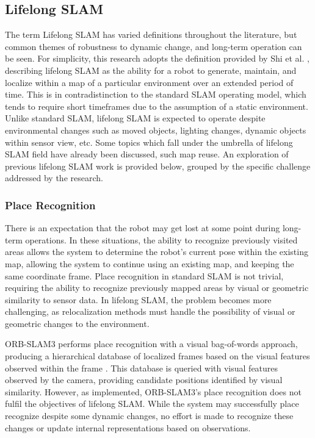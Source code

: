 \subsection{Lifelong SLAM}

The term Lifelong SLAM has varied definitions throughout the literature, but common themes of robustness to dynamic change, and long-term operation can be seen. For simplicity, this research adopts the definition provided by Shi et al. \cite{shiAreWeReady2020}, describing lifelong SLAM as the ability for a robot to generate, maintain, and localize within a map of a particular environment over an extended period of time. This is in contradistinction to the standard SLAM operating model, which tends to require short timeframes due to the assumption of a static environment. Unlike standard SLAM, lifelong SLAM is expected to operate despite environmental changes such as moved objects, lighting changes, dynamic objects within sensor view, etc. Some topics which fall under the umbrella of lifelong SLAM field have already been discussed, such map reuse. An exploration of previous lifelong SLAM work is provided below, grouped by the specific challenge addressed by the research.

\subsubsection{Place Recognition}

There is an expectation that the robot may get lost at some point during long-term operations. In these situations, the ability to recognize previously visited areas allows the system to determine the robot's current pose within the existing map, allowing the system to continue using an existing map, and keeping the same coordinate frame. Place recognition in standard SLAM is not trivial, requiring the ability to recognize previously mapped areas by visual or geometric similarity to sensor data. In lifelong SLAM, the problem becomes more challenging, as relocalization methods must handle the possibility of visual or geometric changes to the environment.

ORB-SLAM3 performs place recognition with a visual bag-of-words approach, producing a hierarchical database of localized frames based on the visual features observed within the frame \cite{camposORBSLAM3AccurateOpenSource2021}\cite{galvez-lopezBagsBinaryWords2012}. This database is queried with visual features observed by the camera, providing candidate positions identified by visual similarity. However, as implemented, ORB-SLAM3's place recognition does not fulfil the objectives of lifelong SLAM. While the system may successfully place recognize despite some dynamic changes, no effort is made to recognize these changes or update internal representations based on observations.



